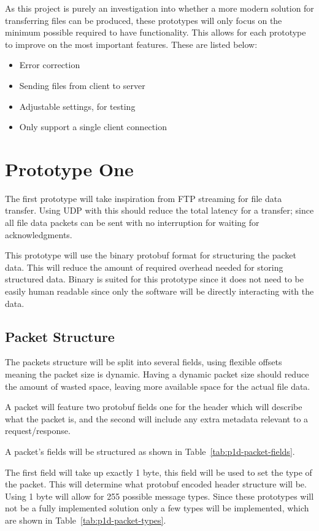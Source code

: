 As this project is purely an investigation into whether a more modern solution for transferring files can be produced, these prototypes will only focus on the minimum possible required to have functionality. This allows for each prototype to improve on the most important features. These are listed below:

\begin{itemize}
	\item Error correction
	\item Sending files from client to server
	\item Adjustable settings, for testing
	\item Only support a single client connection
\end{itemize}


\section{Prototype One}
The first prototype will take inspiration from FTP streaming for file data transfer. Using UDP with this should reduce the total latency for a transfer; since all file data packets can be sent with no interruption for waiting for acknowledgments.

This prototype will use the binary protobuf format for structuring the packet data. This will reduce the amount of required overhead needed for storing structured data. Binary is suited for this prototype since it does not need to be easily human readable since only the software will be directly interacting with the data.

\subsection*{Packet Structure}
The packets structure will be split into several fields, using flexible offsets meaning the packet size is dynamic. Having a dynamic packet size should reduce the amount of wasted space, leaving more available space for the actual file data.

A packet will feature two protobuf fields one for the header which will describe what the packet is, and the second will include any extra metadata relevant to a request/response.

A packet's fields will be structured as shown in Table~\ref{tab:p1d-packet-fields}.

The first field will take up exactly 1 byte, this field will be used to set the type of the packet. This will determine what protobuf encoded header structure will be. Using 1 byte will allow for 255 possible message types. Since these prototypes will not be a fully implemented solution only a few types will be implemented, which are shown in Table~\ref{tab:p1d-packet-types}.

